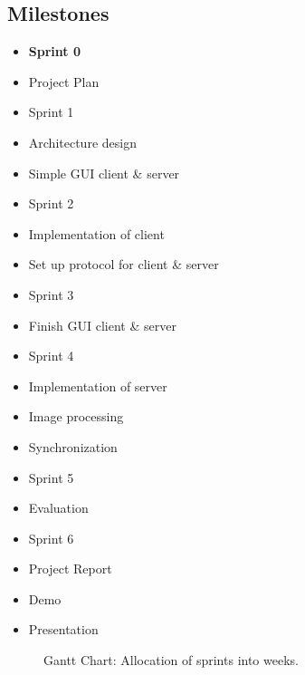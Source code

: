 \documentclass{article}
\begin{document}
\subsection{Milestones}

\begin{itemize}
    \item \textbf{Sprint 0}
    \item Project Plan
    \item Sprint 1
    \item Architecture design
    \item Simple GUI client \& server
    \item Sprint 2
    \item Implementation of client
    \item Set up protocol for client \& server
    \item Sprint 3
    \item Finish GUI client \& server
    \item Sprint 4
    \item Implementation of server
        \item Image processing
        \item Synchronization
    \item Sprint 5
    \item Evaluation
    \item Sprint 6
    \item Project Report
    \item Demo
    \item Presentation
\end{itemize}

\begin{figure}
\begin{center}
\caption{Gantt Chart: Allocation of sprints into weeks.}
\begin{sideways}
\begin{gantt}{8}{14}
    \begin{ganttitle}
    \end{ganttitle}
\end{gantt}
\end{sideways}
\end{center}
\end{figure}
\end{document}
